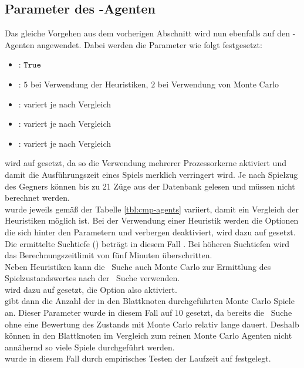 \subsection{Parameter des \mxZitat{\abp}-Agenten}
\label{eval:agents:params:subsec-ab}
Das gleiche Vorgehen aus dem vorherigen Abschnitt wird nun ebenfalls auf den \mxZitat{\abp}-Agenten angewendet.
Dabei werden die Parameter wie folgt festgesetzt:
\begin{itemize}
\item {}: $\mathtt{True}$
\item {}: $5$ bei Verwendung der Heuristiken, $2$ bei Verwendung von Monte Carlo
\item {}: variert je nach Vergleich
\item {}: variert je nach Vergleich
\item {}: variert je nach Vergleich
\end{itemize}
 wird auf  gesetzt, da so die Verwendung mehrerer Prozessorkerne aktiviert und damit die Ausführungszeit eines Spiels merklich verringert wird. Je nach Spielzug des Gegners können bis zu 21 Züge aus der Datenbank  gelesen und müssen nicht berechnet werden.
\\ wurde jeweils gemäß der Tabelle \ref{tbl:cmp-agents} variiert, damit ein Vergleich der Heuristiken möglich ist. Bei der Verwendung einer Heuristik werden die Optionen die sich hinter den Parametern  und  verbergen deaktiviert,  wird dazu auf  gesetzt. 
Die ermittelte Suchtiefe () beträgt in diesem Fall . Bei höheren Suchtiefen wird das Berechnungszeitlimit von fünf Minuten überschritten.
\vspace{0.5cm}
\\Neben Heuristiken kann die \abab\ Suche auch Monte Carlo zur Ermittlung des Spielzustandswertes nach der \abab\ Suche verwenden.
\\ wird dazu auf  gesetzt, die Option also aktiviert. \\ gibt dann die Anzahl der in den Blattknoten durchgeführten Monte Carlo Spiele an. Dieser Parameter wurde in diesem Fall auf $10$ gesetzt, da bereits die \abab\ Suche ohne eine Bewertung des Zustands mit Monte Carlo relativ lange dauert. Deshalb können in den Blattknoten im Vergleich zum reinen Monte Carlo Agenten nicht annähernd so viele Spiele durchgeführt werden.
\\ wurde in diesem Fall durch empirisches Testen der Laufzeit auf  festgelegt. 

